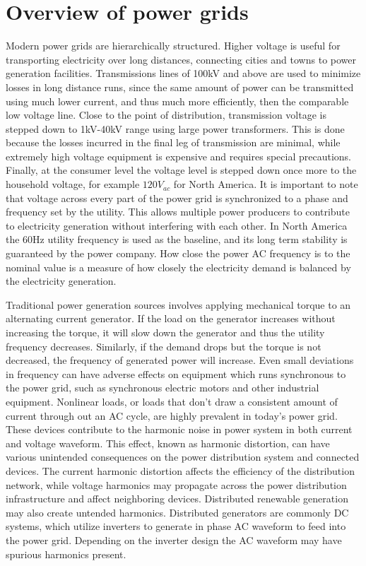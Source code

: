 \section{Overview of power grids}\label{sec:overview-of-power-grids}
Modern power grids are hierarchically structured.
Higher voltage is useful for transporting electricity over long distances, connecting cities and towns to power generation facilities.
Transmissions lines of 100kV and above are used to minimize losses in long distance runs, since the same amount of power can be transmitted using much lower current, and thus much more efficiently, then the comparable low voltage line.
Close to the point of distribution, transmission voltage is stepped down to 1kV-40kV range using large power transformers.
This is done because the losses incurred in the final leg of transmission are minimal, while extremely high voltage equipment is expensive and requires special precautions.\cite{sivanagaraju2008electric} Finally, at the consumer level the voltage level is stepped down once more to the household voltage, for example $120V_{ac}$ for North America.
It is important to note that voltage across every part of the power grid is synchronized to a phase and frequency set by the utility.
This allows multiple power producers to contribute to electricity generation without interfering with each other.\cite{blaabjerg2006overview} In North America the 60Hz utility frequency is used as the baseline, and its long term stability is guaranteed by the power company.
How close the power AC frequency is to the nominal value is a measure of how closely the electricity demand is balanced by the electricity generation.


Traditional power generation sources involves applying mechanical torque to an alternating current generator.
If the load on the generator increases without increasing the torque, it will slow down the generator and thus the utility frequency decreases.
Similarly, if the demand drops but the torque is not decreased, the frequency of generated power will increase.
Even small deviations in frequency can have adverse effects on equipment which runs synchronous to the power grid, such as synchronous electric motors and other industrial equipment.\cite{morren2006wind} Nonlinear loads, or loads that don't draw a consistent amount of current through out an AC cycle, are highly prevalent in today's power grid.
These devices contribute to the harmonic noise in power system in both current and voltage waveform.
This effect, known as harmonic distortion, can have various unintended consequences on the power distribution system and connected devices.
The current harmonic distortion affects the efficiency of the distribution network, while voltage harmonics may propagate across the power distribution infrastructure and affect neighboring devices.\cite{muhamad2007effects} Distributed renewable generation may also create untended harmonics.
Distributed generators are commonly DC systems, which utilize inverters to generate in phase AC waveform to feed into the power grid.
Depending on the inverter design the AC waveform may have spurious harmonics present.\cite{morren2006wind}

